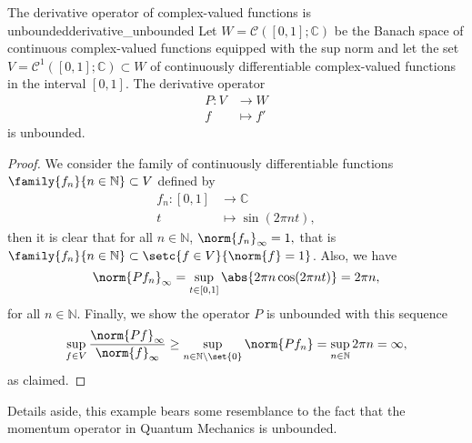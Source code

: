 \begin{example}{The derivative operator of complex-valued functions is unbounded}{derivative_unbounded}
    Let \(W = \mathcal{C}([0,1]; \mathbb{C})\) be the Banach space of continuous complex-valued functions equipped with the sup norm and let the set \(V = \mathcal{C}^1([0,1];\mathbb{C})\subset W\) of continuously differentiable complex-valued functions in the interval \([0,1]\). The derivative operator
    \begin{align*}
        P : V &\to W\\
            f &\mapsto f'
    \end{align*}
    is unbounded.
\end{example}
\begin{proof}
    We consider the family of continuously differentiable functions \(\family{f_n}{n\in \mathbb{N}}\subset V\) defined by
    \begin{align*}
        f_n : [0,1] &\to \mathbb{C}\\
                  t &\mapsto \sin(2\pi n t),
    \end{align*}
    then it is clear that for all \(n \in \mathbb{N}\), \(\norm{f_n}_\infty = 1,\) that is \(\family{f_n}{n\in \mathbb{N}} \subset \setc{f \in V}{\norm{f} = 1}\). Also, we have
    \begin{equation*}
        \norm{P f_n}_\infty = \sup_{t \in [0,1]} \abs{2\pi n \cos(2\pi nt)} = 2\pi n,
    \end{equation*}
    for all \(n \in \mathbb{N}\). Finally, we show the operator \(P\) is unbounded with this sequence
    \begin{equation*}
        \sup_{f \in V} \frac{\norm{P f}_\infty}{\norm{f}_\infty} \geq \sup_{n \in \mathbb{N}\setminus\set{0}} \norm{P f_n} = \sup_{n \in \mathbb{N}} 2\pi n = \infty,
    \end{equation*}
    as claimed.
\end{proof}
\begin{remark}
    Details aside, this example bears some resemblance to the fact that the momentum operator in Quantum Mechanics is unbounded.
\end{remark}

